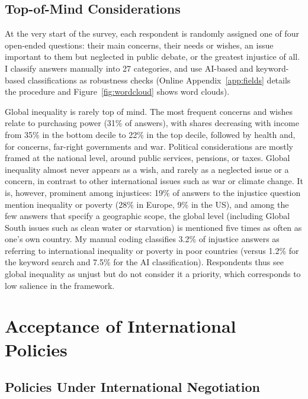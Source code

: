 \documentclass[12pt,english]{article}
\begin{document}
\subsection{Top-of-Mind Considerations}\label{subsec:considerations}

At the very start of the survey, each respondent is randomly assigned one of four open-ended questions: their main concerns, their needs or wishes, an issue important to them but neglected in public debate, or the greatest injustice of all. I classify answers manually into 27 categories, and use AI-based and keyword-based classifications as robustness checks (Online Appendix~\ref{app:fields} details the procedure and Figure~\ref{fig:wordcloud} shows word clouds).

Global inequality is rarely top of mind. The most frequent concerns and wishes relate to purchasing power (31\% of answers), with shares decreasing with income from 35\% in the bottom decile to 22\% in the top decile, followed by health and, for concerns, far-right governments and war. Political considerations are mostly framed at the national level, around public services, pensions, or taxes. Global inequality almost never appears as a wish, and rarely as a neglected issue or a concern, in contrast to other international issues such as war or climate change. It is, however, prominent among injustices: 19\% of answers to the injustice question mention inequality or poverty (28\% in Europe, 9\% in the US), and among the few answers that specify a geographic scope, the global level (including Global South issues such as clean water or starvation) is mentioned five times as often as one's own country. My manual coding classifies 3.2\% of injustice answers as referring to international inequality or poverty in poor countries (versus 1.2\% for the keyword search and 7.5\% for the AI classification). Respondents thus see global inequality as unjust but do not consider it a priority, which corresponds to low salience in the framework.

\section{Acceptance of International Policies}\label{sec:breadth}

\subsection{Policies Under International Negotiation}\label{subsec:debated}
\end{document}
